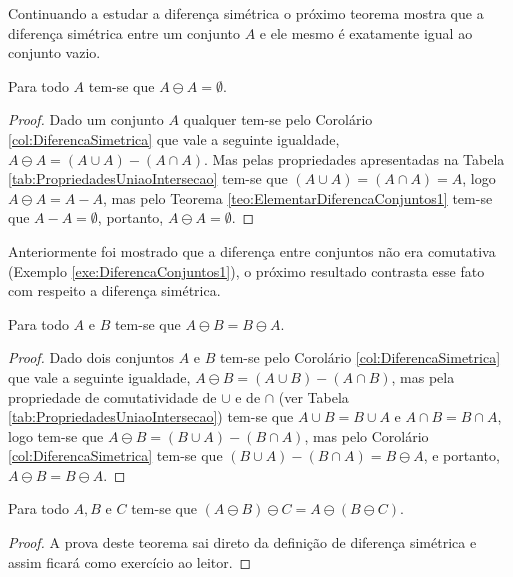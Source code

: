 Continuando a estudar a diferença simétrica o próximo teorema mostra que a diferença simétrica entre um conjunto $A$ e ele mesmo é exatamente igual ao conjunto vazio.

\begin{teorema}
  Para todo $A$ tem-se que $A \ominus A = \emptyset$.
\end{teorema}

\begin{proof}
	Dado um conjunto $A$ qualquer tem-se pelo Corolário \ref{col:DiferencaSimetrica} que vale a seguinte igualdade,  $A \ominus A = (A \cup A) - (A \cap A)$. Mas pelas propriedades apresentadas na Tabela \ref{tab:PropriedadesUniaoIntersecao} tem-se que $(A \cup A) = (A \cap A) = A$, logo $A \ominus A =  A - A$, mas pelo Teorema \ref{teo:ElementarDiferencaConjuntos1} tem-se que $A - A = \emptyset$, portanto, $A \ominus A = \emptyset$.
\end{proof}

Anteriormente foi mostrado que a diferença entre conjuntos não era comutativa (Exemplo \ref{exe:DiferencaConjuntos1}), o próximo resultado contrasta esse fato com respeito a diferença simétrica.

\begin{teorema}
	Para todo $A$ e $B$ tem-se que $A \ominus B = B \ominus A$.
\end{teorema}

\begin{proof}
	Dado dois conjuntos $A$ e $B$ tem-se pelo Corolário \ref{col:DiferencaSimetrica} que vale a seguinte igualdade,  $A \ominus B = (A \cup B) - (A \cap B)$, mas pela propriedade de comutatividade de $\cup$ e de $\cap$ (ver Tabela \ref{tab:PropriedadesUniaoIntersecao}) tem-se que $A \cup B = B \cup A$ e $A \cap B = B \cap A$, logo tem-se que $A \ominus B = (B \cup A) - (B \cap A)$, mas pelo Corolário \ref{col:DiferencaSimetrica} tem-se que $(B \cup A) - (B \cap A) = B \ominus A$, e portanto, $A \ominus B = B \ominus A$.
\end{proof}

\begin{teorema}
	Para todo $A, B$ e $C$ tem-se que $(A \ominus B) \ominus C = A \ominus (B \ominus C)$.
\end{teorema}

\begin{proof}
	A prova deste teorema sai direto da definição de diferença simétrica e assim ficará como exercício ao leitor.
\end{proof}

